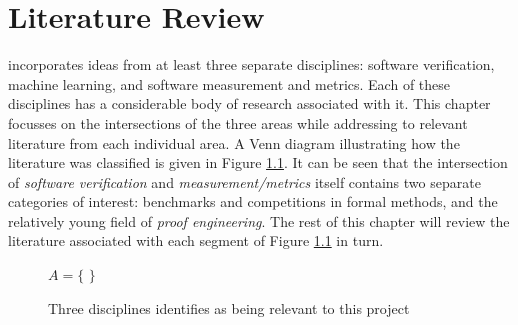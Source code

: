 \chapter{Literature Review}%
\thispagestyle{nohead}
\label{LitReview} %


\where incorporates ideas from at least three separate disciplines: software verification, machine learning, and software measurement and metrics. Each of these disciplines has a considerable body of research associated with it. This chapter focusses on the intersections of the three areas while addressing to relevant literature from each individual area.
A Venn diagram illustrating how the literature was classified is given in Figure \ref{fig:litreview}. It can be seen that the intersection of \textit{software verification} and \textit{measurement/metrics} itself contains two separate categories of interest: benchmarks and competitions in formal methods, and the relatively young field of \textit{proof engineering}.
The rest of this chapter will review the literature associated with each segment of Figure \ref{fig:litreview} in turn.

\begin{figure}

\centering


\def\firstcircle{(0,0) circle (2.5cm)}
\def\secondcircle{(55:3cm) circle (2.5cm)}
\def\thirdcircle{(0:3cm) circle (2.5cm)}


$ A = \lbrace $ \cite{DPVZ15:CAV} $ \rbrace $

\caption{Three disciplines identifies as being relevant to this project}
\label{fig:litreview}

\end{figure}


